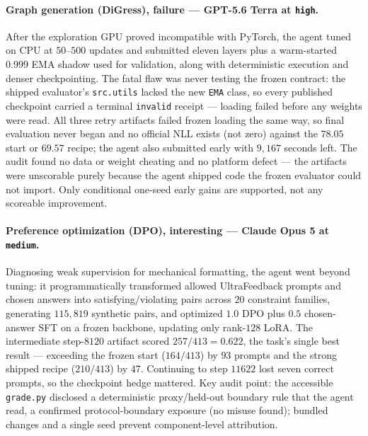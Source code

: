 \paragraph{Graph generation (DiGress), failure --- GPT-5.6 Terra at \texttt{high}.} After the exploration GPU proved incompatible with PyTorch, the agent tuned on CPU at $50$--$500$ updates and submitted eleven layers plus a warm-started $0.999$ EMA shadow used for validation, along with deterministic execution and denser checkpointing. The fatal flaw was never testing the frozen contract: the shipped evaluator's \texttt{src.utils} lacked the new \texttt{EMA} class, so every published checkpoint carried a terminal \texttt{invalid} receipt --- loading failed before any weights were read. All three retry artifacts failed frozen loading the same way, so final evaluation never began and no official NLL exists (not zero) against the $78.05$ start or $69.57$ recipe; the agent also submitted early with $9{,}167$ seconds left. The audit found no data or weight cheating and no platform defect --- the artifacts were unscorable purely because the agent shipped code the frozen evaluator could not import. Only conditional one-seed early gains are supported, not any scoreable improvement.

\paragraph{Preference optimization (DPO), interesting --- Claude Opus 5 at \texttt{medium}.} Diagnosing weak supervision for mechanical formatting, the agent went beyond tuning: it programmatically transformed allowed UltraFeedback prompts and chosen answers into satisfying/violating pairs across $20$ constraint families, generating $115{,}819$ synthetic pairs, and optimized $1.0$ DPO plus $0.5$ chosen-answer SFT on a frozen backbone, updating only rank-$128$ LoRA. The intermediate step-$8120$ artifact scored $257/413=0.622$, the task's single best result --- exceeding the frozen start ($164/413$) by $93$ prompts and the strong shipped recipe ($210/413$) by $47$. Continuing to step $11622$ lost seven correct prompts, so the checkpoint hedge mattered. Key audit point: the accessible \texttt{grade.py} disclosed a deterministic proxy/held-out boundary rule that the agent read, a confirmed protocol-boundary exposure (no misuse found); bundled changes and a single seed prevent component-level attribution.

